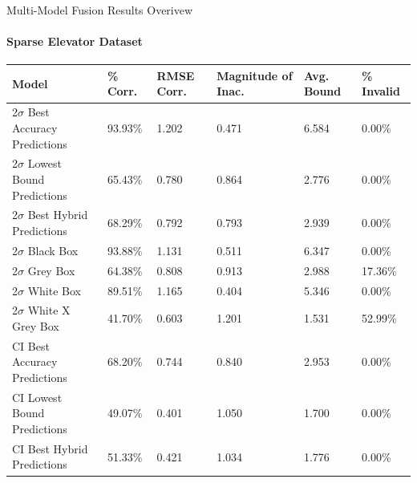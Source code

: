 \documentclass{beamer}
\begin{document}
\begin{frame}[t]{Multi-Model Fusion Results Overivew}
  \framesubtitle{Sparse Elevator Dataset}

  \vspace*{-0.5cm}
  \begin{table}[htp!]
  \tiny
  \begin{tabular}{|p{2.5cm}|p{1.3cm}|p{1.0cm}|p{1.7cm}|p{1.0cm}|p{1.5cm}|}

      \hline
      \textbf{Model} &
      \textbf{\% Corr.} &
      \textbf{RMSE Corr.} &
      \textbf{Magnitude of Inac.} &
      \textbf{Avg. Bound} &
      \textbf{\% Invalid} \\
      \hline

      2$\sigma$ Best Accuracy Predictions &
      93.93\% &
      1.202 &
      0.471 &
      6.584 &
      0.00\% \\
      \hline

      2$\sigma$ Lowest Bound Predictions &
      65.43\% &
      0.780 &
      0.864 &
      2.776 &
      0.00\% \\
      \hline

      2$\sigma$ Best Hybrid Predictions &
      68.29\% &
      0.792 &
      0.793 &
      2.939 &
      0.00\% \\
      \hline

      2$\sigma$ Black Box &
      93.88\% &
      1.131 &
      0.511 &
      6.347 &
      0.00\% \\
      \hline

      2$\sigma$ Grey Box &
      64.38\% &
      0.808 &
      0.913 &
      2.988 &
      17.36\% \\
      \hline

      2$\sigma$ White Box &
      89.51\% &
      1.165 &
      0.404 &
      5.346 &
      0.00\% \\
      \hline

      2$\sigma$ White X Grey Box &
      41.70\% &
      0.603 &
      1.201 &
      1.531 &
      52.99\% \\
      \hline

      CI Best Accuracy Predictions &
      68.20\% &
      0.744 &
      0.840 &
      2.953 &
      0.00\% \\
      \hline

      CI Lowest Bound Predictions &
      49.07\% &
      0.401 &
      1.050 &
      1.700 &
      0.00\% \\
      \hline

      CI Best Hybrid Predictions &
      51.33\% &
      0.421 &
      1.034 &
      1.776 &
      0.00\% \\
      \hline


\end{tabular}
\end{table}
\end{frame}
\end{document}
